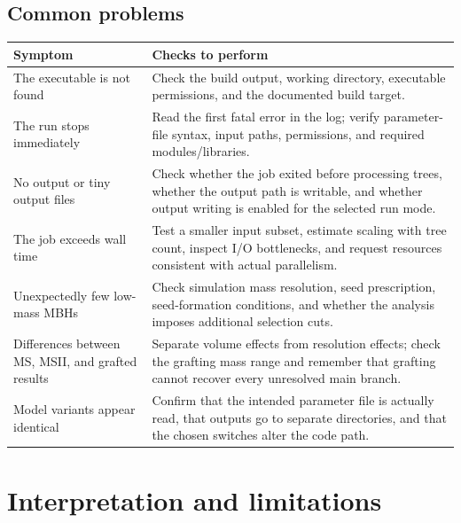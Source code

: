 \documentclass[11pt,a4paper]{article}
\begin{document}
\subsection{Common problems}
\begin{longtable}{>{\raggedright\arraybackslash}p{4.0cm}>{\raggedright\arraybackslash}p{9.8cm}}
\toprule
\textbf{Symptom} & \textbf{Checks to perform} \\
\midrule
\endhead
The executable is not found & Check the build output, working directory, executable permissions, and the documented build target. \\
The run stops immediately & Read the first fatal error in the log; verify parameter-file syntax, input paths, permissions, and required modules/libraries. \\
No output or tiny output files & Check whether the job exited before processing trees, whether the output path is writable, and whether output writing is enabled for the selected run mode. \\
The job exceeds wall time & Test a smaller input subset, estimate scaling with tree count, inspect I/O bottlenecks, and request resources consistent with actual parallelism. \\
Unexpectedly few low-mass MBHs & Check simulation mass resolution, seed prescription, seed-formation conditions, and whether the analysis imposes additional selection cuts. \\
Differences between MS, MSII, and grafted results & Separate volume effects from resolution effects; check the grafting mass range and remember that grafting cannot recover every unresolved main branch. \\
Model variants appear identical & Confirm that the intended parameter file is actually read, that outputs go to separate directories, and that the chosen switches alter the code path. \\
\bottomrule
\end{longtable}

\section{Interpretation and limitations}
\end{document}
